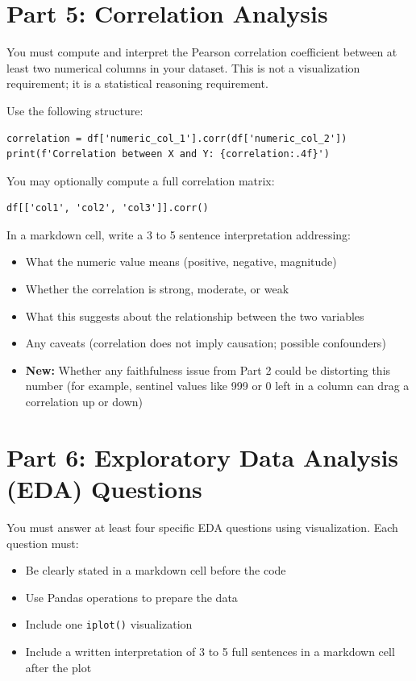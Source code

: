 \documentclass[11pt,letterpaper]{article}
\newcommand{\code}[1]{\texttt{#1}}
\begin{document}
\section{Part 5: Correlation Analysis}

You must compute and interpret the Pearson correlation coefficient between at least two numerical columns in your dataset. This is not a visualization requirement; it is a statistical reasoning requirement.

Use the following structure:
\begin{lstlisting}
correlation = df['numeric_col_1'].corr(df['numeric_col_2'])
print(f'Correlation between X and Y: {correlation:.4f}')
\end{lstlisting}

You may optionally compute a full correlation matrix:
\begin{lstlisting}
df[['col1', 'col2', 'col3']].corr()
\end{lstlisting}

In a markdown cell, write a 3 to 5 sentence interpretation addressing:
\begin{itemize}
  \item What the numeric value means (positive, negative, magnitude)
  \item Whether the correlation is strong, moderate, or weak
  \item What this suggests about the relationship between the two variables
  \item Any caveats (correlation does not imply causation; possible confounders)
  \item \textbf{New:} Whether any faithfulness issue from Part 2 could be distorting this number (for example, sentinel values like 999 or 0 left in a column can drag a correlation up or down)
\end{itemize}

\section{Part 6: Exploratory Data Analysis (EDA) Questions}

You must answer at least four specific EDA questions using visualization. Each question must:
\begin{itemize}
  \item Be clearly stated in a markdown cell before the code
  \item Use Pandas operations to prepare the data
  \item Include one \code{iplot()} visualization
  \item Include a written interpretation of 3 to 5 full sentences in a markdown cell after the plot
\end{itemize}
\end{document}
